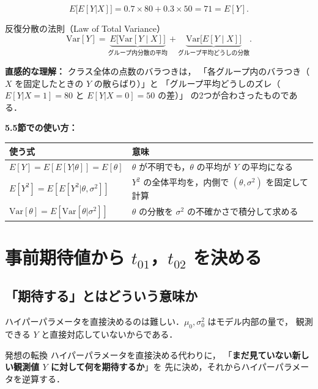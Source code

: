 \documentclass[lualatex,ja=standard,a4paper,12pt]{bxjsarticle}
\begin{document}
\[
  E\!\bigl[E[Y|X]\bigr]
  = 0.7 \times 80 + 0.3 \times 50 = 71
  = E[Y].
\]

\begin{thmbox}{反復分散の法則（Law of Total Variance）}
\[
  \mathrm{Var}[Y]
  = \underbrace{E\!\bigl[\mathrm{Var}[Y \mid X]\bigr]}_{\text{グループ内分散の平均}}
  + \underbrace{\mathrm{Var}\!\bigl[E[Y \mid X]\bigr]}_{\text{グループ平均どうしの分散}}.
\]
\end{thmbox}

\noindent\textbf{直感的な理解：}
クラス全体の点数のバラつきは，
「各グループ内のバラつき（$X$ を固定したときの $Y$ の散らばり）」と
「グループ平均どうしのズレ（$E[Y|X=1]=80$ と $E[Y|X=0]=50$ の差）」
の2つが合わさったものである．

\medskip
\noindent\textbf{5.5節での使い方：}

\begin{center}
\renewcommand{\arraystretch}{1.5}
\begin{tabular}{ll}
\toprule
使う式 & 意味 \\
\midrule
$E[Y] = E[E[Y|\theta]] = E[\theta]$ & $\theta$ が不明でも，$\theta$ の平均が $Y$ の平均になる \\
$E[Y^2] = E[E[Y^2|\theta,\sigma^2]]$ & $Y^2$ の全体平均を，内側で $(\theta,\sigma^2)$ を固定して計算 \\
$\mathrm{Var}[\theta] = E[\mathrm{Var}[\theta|\sigma^2]]$ & $\theta$ の分散を $\sigma^2$ の不確かさで積分して求める \\
\bottomrule
\end{tabular}
\end{center}

\section{事前期待値から $t_{01}$，$t_{02}$ を決める}

\subsection*{「期待する」とはどういう意味か}

ハイパーパラメータを直接決めるのは難しい．$\mu_0, \sigma_0^2$ はモデル内部の量で，
観測できる $Y$ と直接対応していないからである．

\begin{thmbox}{発想の転換}
ハイパーパラメータを直接決める代わりに，
「\textbf{まだ見ていない新しい観測値 $Y$ に対して何を期待するか}」を
先に決め，それからハイパーパラメータを逆算する．
\end{thmbox}
\end{document}
